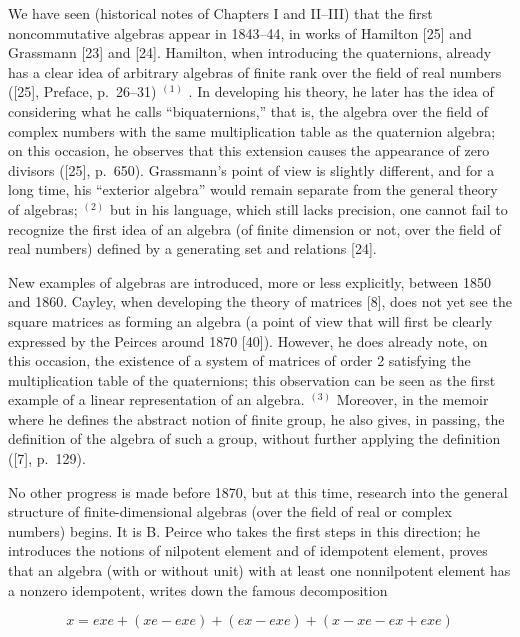\backmatter
{}

We have seen (historical notes of Chapters I and II--III) that the first noncommutative algebras appear in 1843--44, in works of Hamilton {[}25{]} and Grassmann {[}23{]} and {[}24{]}. Hamilton, when introducing the quaternions, already has a clear idea of arbitrary algebras of finite rank over the field of real numbers ({[}25{]}, Preface, p.~26--31) \(^{(1)}\) . In developing his theory, he later has the idea of considering what he calls ``biquaternions,'' that is, the algebra over the field of complex numbers with the same multiplication table as the quaternion algebra; on this occasion, he observes that this extension causes the appearance of zero divisors ({[}25{]}, p.~650). Grassmann's point of view is slightly different, and for a long time, his ``exterior algebra'' would remain separate from the general theory of algebras; \(^{(2)}\) but in his language, which still lacks precision, one cannot fail to recognize the first idea of an algebra (of finite dimension or not, over the field of real numbers) defined by a generating set and relations {[}24{]}.

New examples of algebras are introduced, more or less explicitly, between 1850 and 1860. Cayley, when developing the theory of matrices {[}8{]}, does not yet see the square matrices as forming an algebra (a point of view that will first be clearly expressed by the Peirces around 1870 {[}40{]}). However, he does already note, on this occasion, the existence of a system of matrices of order 2 satisfying the multiplication table of the quaternions; this observation can be seen as the first example of a linear representation of an algebra. \(^{(3)}\) Moreover, in the memoir where he defines the abstract notion of finite group, he also gives, in passing, the definition of the algebra of such a group, without further applying the definition ({[}7{]}, p.~129).

No other progress is made before 1870, but at this time, research into the general structure of finite-dimensional algebras (over the field of real or complex numbers) begins. It is B. Peirce who takes the first steps in this direction; he introduces the notions of nilpotent element and of idempotent element, proves that an algebra (with or without unit) with at least one nonnilpotent element has a nonzero idempotent, writes down the famous decomposition

\[
x = e x e + (x e - e x e) + (e x - e x e) + (x - x e - e x + e x e)
\]

